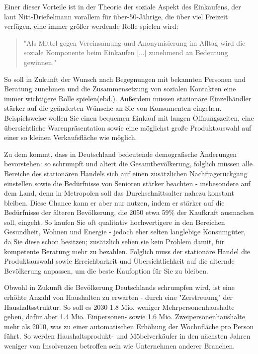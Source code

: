 \begin{folding}
Einer dieser Vorteile ist in der Theorie der soziale Aspekt des Einkaufens, der laut Nitt-Drießelmann vorallem für über-50-Jährige, die über viel Freizeit verfügen, eine immer größer werdende Rolle spielen wird\cite[S. 43f]{Nitt}:
\begin{quote}
"Als Mittel gegen Vereinsamung und Anonymisierung im Alltag wird die soziale Komponente beim Einkaufen [...] zunehmend an Bedeutung gewinnen."\cite[S. 43]{Nitt}
\end{quote} 
So soll in Zukunft der Wunsch nach Begegnungen mit bekannten Personen und Beratung zunehmen und die Zusammensetzung von sozialen Kontakten eine immer wichtigere Rolle spielen(ebd.).
Außerdem müssen stationäre Einzelhändler stärker auf die geänderten Wünsche an Sie von Konsumenten eingehen. Beispielsweise wollen Sie einen bequemen Einkauf mit langen Öffnungszeiten, eine übersichtliche Warenpräsentation sowie eine möglichst große Produktauswahl auf einer so kleinen Verkaufsfläche wie möglich\cite[S. 61]{Nitt}.

Zu dem kommt, dass in Deutschland bedeutende demografische Änderungen bevorstehen: so schrumpft und altert die Gesamtbevölkerung, folglich müssen alle Bereiche des stationären Handels sich auf einen zusätzlichen Nachfragerückgang einstellen sowie die Bedürfnisse von Senioren stärker beachten - insbesondere auf dem Land, denn in Metropolen soll das Durchschnittsalter nahezu konstant bleiben\cite[S. 32ff]{Nitt}. Diese Chance kann er aber nur nutzen, indem er stärker auf die Bedürfnisse der älteren Bevölkerung, die 2050 etwa 59\% der Kaufkraft ausmachen soll, eingeht\cite[S. 64]{Nitt}. So kaufen Sie oft qualitativ hochwertigere in den Bereichen Gesundheit, Wohnen und Energie - jedoch eher selten langlebige Konsumgüter, da Sie diese schon besitzen; zusätzlich sehen sie kein Problem damit, für kompetente Beratung mehr zu bezahlen\cite[S. 41f]{Nitt}. Folglich muss der stationäre Handel die Produktauswahl sowie Erreichbarkeit und Übersichtlichkeit auf die alternde Bevölkerung anpassen, um die beste Kaufoption für Sie zu bleiben\cite[S. 64]{Nitt}.

Obwohl in Zukunft die Bevölkerung Deutschlands schrumpfen wird, ist eine erhöhte Anzahl von Haushalten zu erwarten - durch eine "Zerstreuung" der Haushaltsstruktur. So soll es 2030 1.8 Mio. weniger Mehrpersonenhaushalte geben, dafür aber 1.4 Mio. Einpersonen- sowie 1.6 Mio. Zweipersonenhaushalte mehr als 2010\cite[S. 35]{Nitt}, was zu einer automatischen Erhöhung der Wochnfläche pro Person führt. So werden Haushaltsprodukt- und Möbelverkäufer in den nächsten Jahren weniger von Insolvenzen betroffen sein wie Unternehmen anderer Branchen.


\end{folding}
